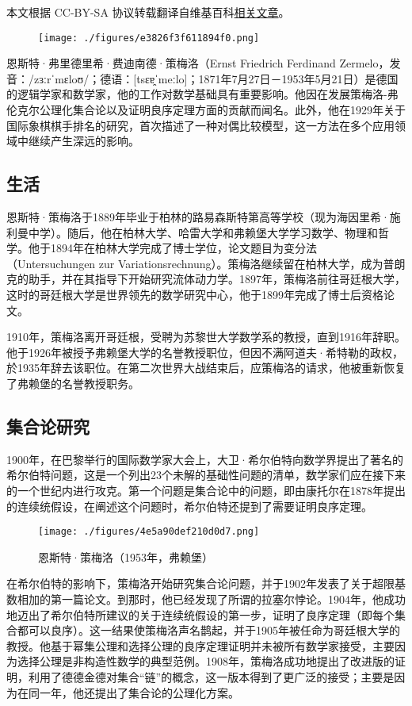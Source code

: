 
本文根据 CC-BY-SA 协议转载翻译自维基百科\href{https://en.wikipedia.org/wiki/Ernst_Zermelo}{相关文章}。

\begin{figure}[ht]
\centering
\texttt{[image: ./figures/e3826f3f611894f0.png]}
\caption{} \label{fig_Zerme_1}
\end{figure}
恩斯特·弗里德里希·费迪南德·策梅洛（Ernst Friedrich Ferdinand Zermelo，发音：/zɜːrˈmɛloʊ/；德语：[tsɛɐ̯ˈmeːlo]；1871年7月27日－1953年5月21日）是德国的逻辑学家和数学家，他的工作对数学基础具有重要影响。他因在发展策梅洛-弗伦克尔公理化集合论以及证明良序定理方面的贡献而闻名。此外，他在1929年关于国际象棋棋手排名的研究，首次描述了一种对偶比较模型，这一方法在多个应用领域中继续产生深远的影响。
\subsection{生活}
恩斯特·策梅洛于1889年毕业于柏林的路易森斯特第高等学校（现为海因里希·施利曼中学）。随后，他在柏林大学、哈雷大学和弗赖堡大学学习数学、物理和哲学。他于1894年在柏林大学完成了博士学位，论文题目为变分法（Untersuchungen zur Variationsrechnung）。策梅洛继续留在柏林大学，成为普朗克的助手，并在其指导下开始研究流体动力学。1897年，策梅洛前往哥廷根大学，这时的哥廷根大学是世界领先的数学研究中心，他于1899年完成了博士后资格论文。

1910年，策梅洛离开哥廷根，受聘为苏黎世大学数学系的教授，直到1916年辞职。他于1926年被授予弗赖堡大学的名誉教授职位，但因不满阿道夫·希特勒的政权，於1935年辞去该职位。在第二次世界大战结束后，应策梅洛的请求，他被重新恢复了弗赖堡的名誉教授职务。
\subsection{集合论研究}
1900年，在巴黎举行的国际数学家大会上，大卫·希尔伯特向数学界提出了著名的希尔伯特问题，这是一个列出23个未解的基础性问题的清单，数学家们应在接下来的一个世纪内进行攻克。第一个问题是集合论中的问题，即由康托尔在1878年提出的连续统假设，在阐述这个问题时，希尔伯特还提到了需要证明良序定理。
\begin{figure}[ht]
\centering
\texttt{[image: ./figures/4e5a90def210d0d7.png]}
\caption{恩斯特·策梅洛（1953年，弗赖堡） } \label{fig_Zerme_2}
\end{figure}
在希尔伯特的影响下，策梅洛开始研究集合论问题，并于1902年发表了关于超限基数相加的第一篇论文。到那时，他已经发现了所谓的拉塞尔悖论。1904年，他成功地迈出了希尔伯特所建议的关于连续统假设的第一步，证明了良序定理（即每个集合都可以良序）。这一结果使策梅洛声名鹊起，并于1905年被任命为哥廷根大学的教授。他基于幂集公理和选择公理的良序定理证明并未被所有数学家接受，主要因为选择公理是非构造性数学的典型范例。1908年，策梅洛成功地提出了改进版的证明，利用了德德金德对集合“链”的概念，这一版本得到了更广泛的接受；主要是因为在同一年，他还提出了集合论的公理化方案。

